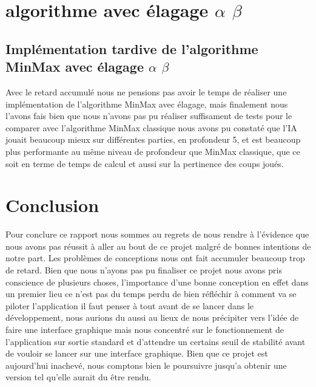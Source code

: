 \documentclass[12pt, legalpaper]{article}
\begin{document}
\newpage

\section{algorithme avec élagage $\alpha$ $\beta$ }
\subsection{Implémentation tardive de l'algorithme MinMax avec élagage  $\alpha$ $\beta$  }
Avec le retard accumulé nous ne pensions pas avoir le temps de réaliser une implémentation de l'algorithme MinMax avec élagage, mais finalement nous l'avons fais bien que nous n'avons pas pu réaliser suffisament de tests pour le comparer avec l'algorithme MinMax classique
nous avons pu constaté que l'IA jouait beaucoup mieux sur différentes parties, en profondeur 5, et est beaucoup plus performante au même niveau de profondeur que MinMax classique, que ce soit en terme de temps de calcul et aussi sur la pertinence des coups joués.

\newpage

\section{Conclusion}
Pour conclure ce rapport nous sommes au regrets de nous rendre à l'évidence que nous avons pas réussit à aller au bout de ce projet malgré de bonnes intentions de notre part. Les problèmes de conceptions nous ont fait accumuler beaucoup trop de retard.
Bien que nous n'ayons pas pu finaliser ce projet nous avons pris conscience de plusieurs choses, l'importance d'une bonne conception en effet dans un premier lieu ce n'est pas du temps perdu de bien réfléchir à comment va se piloter l'application il faut penser à tout avant de se lancer dans le développement, nous aurions du aussi au lieux de nous précipiter vers l'idée de faire une interface graphique mais nous concentré sur le fonctionnement de l'application sur sortie standard et d'attendre un certains seuil de stabilité avant de vouloir se lancer sur une interface graphique. Bien que ce projet est aujourd'hui inachevé, nous comptons bien le poursuivre jusqu'a obtenir une version tel qu'elle aurait du être rendu.
\end{document}
